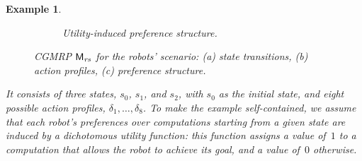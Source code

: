 \documentclass{article}
\newtheorem{example}{Example}
\begin{document}
\begin{example}
\begin{figure}[h]
    \begin{subfigure}[b]{0.48\textwidth}
        \centering
        \caption{Utility-induced preference structure.}
    \end{subfigure}

    \caption{CGMRP 
    $\mathsf{M}_{\mathit{rs}}$
    for the robots' scenario: (a) state transitions, (b) action profiles, (c) preference structure.  }
    \label{CGMRPscenario}
    \vspace{-1em}
\end{figure}


It consists of three states, $s_0$, $s_1$, and $s_2$, with $s_0$ as the initial state, and eight possible action profiles, $\delta_1, \ldots, \delta_8$. 
To make the example self-contained, we assume that each robot’s preferences over computations starting from a given state are induced by a dichotomous utility function: 
this function assigns a value of~$1$ to a computation that allows the robot to achieve its goal, and a value of~$0$ otherwise. 

\end{example}
\end{document}

